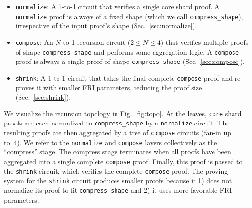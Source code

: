\documentclass[11pt]{article}
\begin{document}
\begin{itemize}
\item \texttt{normalize}:
A 1-to-1 circuit that verifies a single core shard proof. A \texttt{normalize} proof
is always of a fixed shape (which we call \texttt{compress\_shape}), irrespective of
the input proof's shape (Sec.~\ref{sec:normalize}).
\item \texttt{compose}:
An $N$-to-1 recursion circuit ($2\leq N\leq 4$) that verifies multiple
proofs of shape \texttt{compress shape} and performs some aggregation logic.
A \texttt{compose} proof is always a single proof of shape \texttt{compress\_shape}
(Sec.~\ref{sec:compose}).
\item \texttt{shrink}:
A 1-to-1 circuit that takes the final complete \texttt{compose}
proof and re-proves it with smaller FRI parameters, reducing
the proof size.
(Sec.~\ref{sec:shrink}).
\end{itemize}

We visualize the recursion topology in Fig.~\ref{fig:topo}.
At the leaves, \texttt{core} shard proofs are each normalized to \texttt{compress\_shape} by a
\texttt{normalize} circuit.
The resulting proofs are then aggregated by a tree of \texttt{compose} circuits
(fan-in up to~4).
We refer to the \texttt{normalize} and \texttt{compose} layers
collectively as the ``compress'' stage.
The compress stage terminates when all proofs have been
aggregated into a single complete \texttt{compose} proof.
Finally, this proof is passed to the \texttt{shrink} circuit, which verifies
the complete \texttt{compose} proof.
The proving system for the \texttt{shrink} circuit produces smaller proofs
because it 1) does not normalize its proof to fit \texttt{compress\_shape} and 2) it uses
more favorable FRI parameters.
\end{document}
